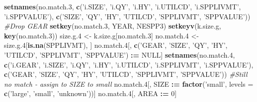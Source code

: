 \documentclass[]{article}
\newenvironment{Shaded}{\begin{snugshade}}{\end{snugshade}}
\newcommand{\KeywordTok}[1]{\textcolor[rgb]{0.13,0.29,0.53}{\textbf{#1}}}
\newcommand{\DataTypeTok}[1]{\textcolor[rgb]{0.13,0.29,0.53}{#1}}
\newcommand{\DecValTok}[1]{\textcolor[rgb]{0.00,0.00,0.81}{#1}}
\newcommand{\StringTok}[1]{\textcolor[rgb]{0.31,0.60,0.02}{#1}}
\newcommand{\CommentTok}[1]{\textcolor[rgb]{0.56,0.35,0.01}{\textit{#1}}}
\newcommand{\OtherTok}[1]{\textcolor[rgb]{0.56,0.35,0.01}{#1}}
\newcommand{\OperatorTok}[1]{\textcolor[rgb]{0.81,0.36,0.00}{\textbf{#1}}}
\newcommand{\ErrorTok}[1]{\textcolor[rgb]{0.64,0.00,0.00}{\textbf{#1}}}
\newcommand{\NormalTok}[1]{#1}
\begin{document}
\begin{Shaded}
\begin{Highlighting}[]
  \KeywordTok{setnames}\NormalTok{(no.match.}\DecValTok{3}\NormalTok{, }\KeywordTok{c}\NormalTok{(}\StringTok{'i.SIZE'}\NormalTok{, }\StringTok{'i.QY'}\NormalTok{, }\StringTok{'i.HY'}\NormalTok{, }\StringTok{'i.UTILCD'}\NormalTok{, }\StringTok{'i.SPPLIVMT'}\NormalTok{, }\StringTok{'i.SPPVALUE'}\NormalTok{), }
                       \KeywordTok{c}\NormalTok{(}\StringTok{'SIZE'}\NormalTok{,   }\StringTok{'QY'}\NormalTok{,   }\StringTok{'HY'}\NormalTok{,  }\StringTok{'UTILCD'}\NormalTok{,  }\StringTok{'SPPLIVMT'}\NormalTok{, }\StringTok{'SPPVALUE'}\NormalTok{))}
  \CommentTok{#Drop GEAR}
  \KeywordTok{setkey}\NormalTok{(no.match.}\DecValTok{3}\NormalTok{, YEAR, NESPP3)}
  \KeywordTok{setkeyv}\NormalTok{(k.size.g, }\KeywordTok{key}\NormalTok{(no.match.}\DecValTok{3}\NormalTok{))}
\NormalTok{  size.g.}\DecValTok{4}\NormalTok{ <-}\StringTok{ }\NormalTok{k.size.g[no.match.}\DecValTok{3}\NormalTok{]}
\NormalTok{  no.match.}\DecValTok{4}\NormalTok{ <-}\StringTok{ }\NormalTok{size.g.}\DecValTok{4}\NormalTok{[}\KeywordTok{is.na}\NormalTok{(SPPLIVMT), ]}
\NormalTok{  no.match.}\DecValTok{4}\NormalTok{[, }\KeywordTok{c}\NormalTok{(}\StringTok{'GEAR'}\NormalTok{, }\StringTok{'SIZE'}\NormalTok{, }\StringTok{'QY'}\NormalTok{, }\StringTok{'HY'}\NormalTok{, }\StringTok{'UTILCD'}\NormalTok{, }\StringTok{'SPPLIVMT'}\NormalTok{, }\StringTok{'SPPVALUE'}\NormalTok{) }\OperatorTok{:}\ErrorTok{=}\StringTok{ }\OtherTok{NULL}\NormalTok{]}
  \KeywordTok{setnames}\NormalTok{(no.match.}\DecValTok{4}\NormalTok{, }\KeywordTok{c}\NormalTok{(}\StringTok{'i.GEAR'}\NormalTok{, }\StringTok{'i.SIZE'}\NormalTok{, }\StringTok{'i.QY'}\NormalTok{, }\StringTok{'i.HY'}\NormalTok{, }\StringTok{'i.UTILCD'}\NormalTok{, }\StringTok{'i.SPPLIVMT'}\NormalTok{, }\StringTok{'i.SPPVALUE'}\NormalTok{), }
                       \KeywordTok{c}\NormalTok{(}\StringTok{'GEAR'}\NormalTok{,   }\StringTok{'SIZE'}\NormalTok{,   }\StringTok{'QY'}\NormalTok{,   }\StringTok{'HY'}\NormalTok{,  }\StringTok{'UTILCD'}\NormalTok{,  }\StringTok{'SPPLIVMT'}\NormalTok{, }\StringTok{'SPPVALUE'}\NormalTok{))}
  \CommentTok{#Still no match - assign to SIZE to small}
\NormalTok{  no.match.}\DecValTok{4}\NormalTok{[, SIZE }\OperatorTok{:}\ErrorTok{=}\StringTok{ }\KeywordTok{factor}\NormalTok{(}\StringTok{'small'}\NormalTok{, }\DataTypeTok{levels =} \KeywordTok{c}\NormalTok{(}\StringTok{'large'}\NormalTok{, }\StringTok{'small'}\NormalTok{, }\StringTok{'unknown'}\NormalTok{))]}
\NormalTok{  no.match.}\DecValTok{4}\NormalTok{[, AREA }\OperatorTok{:}\ErrorTok{=}\StringTok{ }\DecValTok{0}\NormalTok{]}
  

\end{Highlighting}
\end{Shaded}
\end{document}
